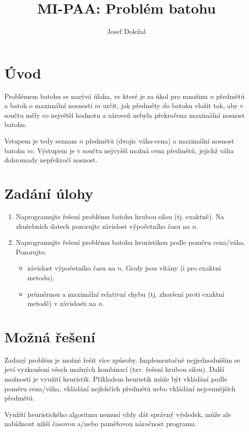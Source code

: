 \documentclass{article}
\title{MI-PAA: Problém batohu}
\author{Josef Doležal}
\begin{document}
\maketitle

\section{Úvod}
Problémem batohu se nazývá úloha, ve které je za úkol pro množinu $n$ předmětů a batoh o maximální nosnosti $m$ určit, jak předměty do batohu vložit tak, aby v součtu měly co největší hodnotu a zároveň nebyla překročena maximální nosnost batohu.

Vstupem je tedy seznam $n$ předmětů (dvojic váha-cena) a maximální nosnost batohu $m$.
Výstupem je v součtu nejvyšší možná cena předmětů, jejichž váha dohromady nepřekročí nosnost.

\section{Zadání úlohy}

\begin{enumerate}
    \item Naprogramujte řešení problému batohu hrubou silou (tj. exaktně). Na zkušebních datech pozorujte závislost výpočetního času na $n$.
    \item Naprogramujte řešení problému batohu heuristikou podle poměru cena/váha. Pozorujte:
    \begin{itemize}
        \item závislost výpočetního času na $n$. Grafy jsou vítány (i pro exaktní metodu).
        \item průměrnou a maximální relativní chybu (tj. zhoršení proti exaktní metodě) v závislosti na $n$.
    \end{itemize}
\end{enumerate}

\section{Možná řešení}

Zadaný problém je možné řešit více způsoby.
Implementačně nejjednodušším se jeví vyzkoušení všech možných kombinací (tzv. řešení hrubou silou).
Další možností je využití heuristik. Příkladem heuristik může být vkládání podle poměru cena/váha, vkládání nejlehčích předmětů nebo vkládání nejcennějších předmětů.

Využití heuristického algoritmu nemusí vždy dát správný výsledek, může ale nabídnout nižší časovou a/nebo paměťovou náročnost programu.
\end{document}
